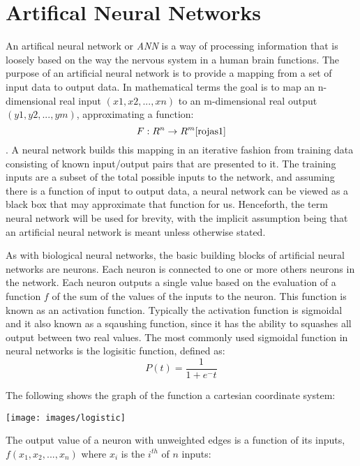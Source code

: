 \section{Artifical Neural Networks}
An artifical neural network or {\it ANN} is a way of processing information that is loosely based on the way the nervous system in a human brain functions.
The purpose of an artificial neural network is to provide a mapping from a set of input data to output data. 
In mathematical terms the goal is to map an n-dimensional real input
$(x1,x2,...,xn)$ to an m-dimensional real output $(y1,y2,...,ym)$, 
approximating a function: \begin{displaymath} F : R^n \rightarrow R^m \cite{rojas1}\end{displaymath}. 
A neural network builds this mapping in an iterative fashion from training data consisting of known input/output pairs that are presented to it. 
The training inputs are a subset of the total possible inputs to the network, and assuming there is a function of input to output data, a neural network can be viewed as a black box that may approximate that function for us.
Henceforth, the term neural network will be used for brevity, with the implicit assumption being that an artificial neural network is meant unless otherwise stated.

As with biological neural networks, the basic building blocks of artificial neural networks are neurons. 
Each neuron is connected to one or more others neurons in the network. 
Each neuron outputs a single value based on the evaluation of a function $f$ of the sum of the values of the inputs to the neuron.
This function is known as an activation function.
Typically the activation function is sigmoidal and it also known as a sqaushing function, since it has the ability to squashes all output between two real values\cite{mitchell1997}.
The most commonly used sigmoidal function in neural networks is the logisitic function, defined as:
\begin{displaymath}P(t) = \frac{1}{1 + e^-t}\end{displaymath}

The following shows the graph of the function a cartesian coordinate system:

\texttt{[image: images/logistic]}

The output value of a neuron with unweighted edges is a function of its inputs, $f(x_1, x_2, ..., x_n)$ where $x_i$ is the $i^{th}$ of $n$ inputs:

